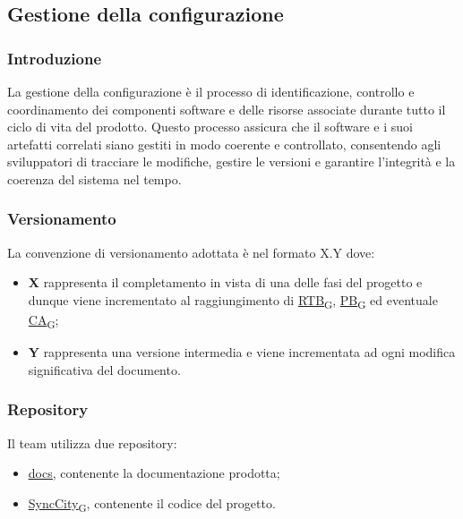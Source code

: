 \subsection{Gestione della configurazione}
\subsubsection{Introduzione}
La gestione della configurazione è il processo di identificazione, controllo e coordinamento dei componenti software e delle risorse associate durante tutto il ciclo di vita del prodotto. Questo processo assicura che il software e i suoi artefatti correlati siano gestiti in modo coerente e controllato, consentendo agli sviluppatori di tracciare le modifiche, gestire le versioni e garantire l'integrità e la coerenza del sistema nel tempo.

\subsubsection{Versionamento}
La convenzione di versionamento adottata è nel formato X.Y dove:
\begin{itemize}
	\item \textbf{X} rappresenta il completamento in vista di una delle fasi del progetto e dunque viene incrementato al raggiungimento di \href{https://7last.github.io/docs/pb/documentazione-interna/glossario\#requirements-and-technology-baseline}{RTB\textsubscript{G}}, \href{https://7last.github.io/docs/pb/documentazione-interna/glossario\#product-baseline}{PB\textsubscript{G}} ed eventuale \href{https://7last.github.io/docs/pb/documentazione-interna/glossario\#customer-acceptance}{CA\textsubscript{G}};
	\item \textbf{Y} rappresenta una versione intermedia e viene incrementata ad ogni modifica significativa del documento.
\end{itemize}

\subsubsection{Repository}
Il team utilizza due repository:
\begin{itemize}
	\item \href{https://github.com/7Last/docs.git}{\underline{docs}}, contenente la documentazione prodotta;
	\item \href{https://github.com/7Last/SyncCity}{\href{https://7last.github.io/docs/pb/documentazione-interna/glossario\#synccity}{\underline{SyncCity}\textsubscript{G}}}, contenente il codice del progetto.
\end{itemize}


